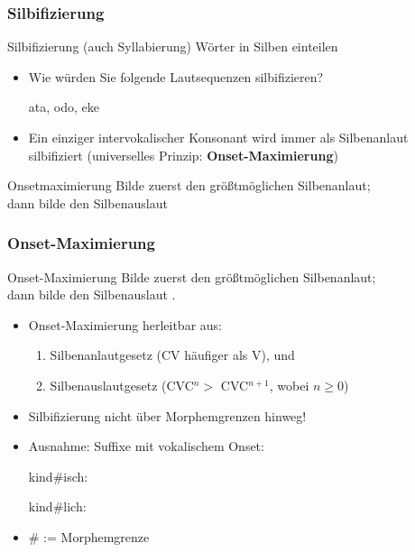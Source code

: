 \begin{frame}
\frametitle{Silbifizierung}

\begin{block}{Silbifizierung (auch Syllabierung)}
	Wörter in Silben einteilen
\end{block}

\begin{itemize}
	\item Wie würden Sie folgende Lautsequenzen silbifizieren?
	
	\ea ata, odo, eke
	\z
	
	\pause
	
	\item Ein einziger intervokalischer Konsonant wird immer als Silbenanlaut silbifiziert (universelles Prinzip: \textbf{Onset-Maximierung})


\end{itemize}

\begin{block}{Onsetmaximierung}
Bilde zuerst den größtmöglichen Silbenanlaut;\\
dann bilde den Silbenauslaut \citep[218]{Hall00a}
\end{block}

\end{frame}


\begin{frame}
\frametitle{Onset-Maximierung}

\begin{block}{Onset-Maximierung}
Bilde zuerst den größtmöglichen Silbenanlaut;\\
dann bilde den Silbenauslaut \citep[218]{Hall00a}.
\end{block}


\begin{itemize}
\item Onset-Maximierung herleitbar aus:
\begin{enumerate}
\item Silbenanlautgesetz (CV häufiger als V), und
\item Silbenauslautgesetz (CVC$^{n} >$ CVC$^{n+1}$, wobei $n \geq 0$)
\end{enumerate}

\pause
\item Silbifizierung nicht über Morphemgrenzen hinweg! 
\item Ausnahme: Suffixe mit vokalischem Onset:

\ea
kind\#isch: 

\ex
kind\#lich: \textipa{[kInt.lI\c{c}]}
\z

\item \# := Morphemgrenze



\end{itemize}

\end{frame}

